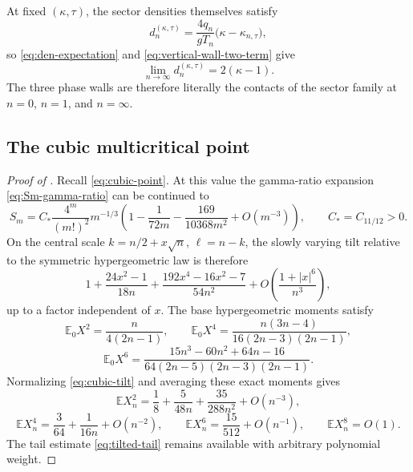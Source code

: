 \documentclass[11pt,a4paper]{amsart}
\numberwithin{equation}{section}
\theoremstyle{plain}
\theoremstyle{definition}
\newcommand{\E}{\mathbb E}
\begin{document}
At fixed \((\kappa,\tau)\), the sector densities themselves satisfy
\[
 d_n^{(\kappa,\tau)}
 =\frac{4q_n}{gT_n}\bigl(\kappa-\kappa_{n,\tau}\bigr),
\]
so \eqref{eq:den-expectation} and \eqref{eq:vertical-wall-two-term} give
\[
 \lim_{n\to\infty}d_n^{(\kappa,\tau)}=2(\kappa-1).
\]
The three phase walls are therefore literally the contacts of the sector
family at \(n=0\), \(n=1\), and \(n=\infty\).

\subsection{The cubic multicritical point}\label{subsec:cubic-point}

\begin{proof}[Proof of ]
Recall \eqref{eq:cubic-point}.  At this value
the gamma-ratio expansion \eqref{eq:Sm-gamma-ratio} can be continued to
\begin{equation}\label{eq:Sm-cubic-expansion}
 S_m=C_*\frac{4^m}{(m!)^2}m^{-1/3}
 \left(1-\frac1{72m}-\frac{169}{10368m^2}+O(m^{-3})\right),
 \qquad C_*=C_{11/12}>0.
\end{equation}
On the central scale \(k=n/2+x\sqrt n\), \(\ell=n-k\), the slowly varying
tilt relative to the symmetric hypergeometric law is therefore
\begin{equation}\label{eq:cubic-tilt}
 1+\frac{24x^2-1}{18n}
 +\frac{192x^4-16x^2-7}{54n^2}
 +O\!\left(\frac{1+|x|^6}{n^3}\right),
\end{equation}
up to a factor independent of \(x\).  The base hypergeometric moments satisfy
\[
 \E_0X^2=\frac{n}{4(2n-1)},
 \qquad
 \E_0X^4=\frac{n(3n-4)}{16(2n-3)(2n-1)},
\]
\[
 \E_0X^6
 =\frac{15n^3-60n^2+64n-16}
 {64(2n-5)(2n-3)(2n-1)}.
\]
Normalizing \eqref{eq:cubic-tilt} and averaging these exact moments gives
\begin{equation}\label{eq:cubic-moments}
 \E X_n^2
 =\frac18+\frac{5}{48n}+\frac{35}{288n^2}+O(n^{-3}),
\end{equation}
\[
 \E X_n^4=\frac3{64}+\frac1{16n}+O(n^{-2}),
 \qquad
 \E X_n^6=\frac{15}{512}+O(n^{-1}),
 \qquad
 \E X_n^8=O(1).
\]
The tail estimate \eqref{eq:tilted-tail} remains available with arbitrary
polynomial weight.


\end{proof}
\end{document}
